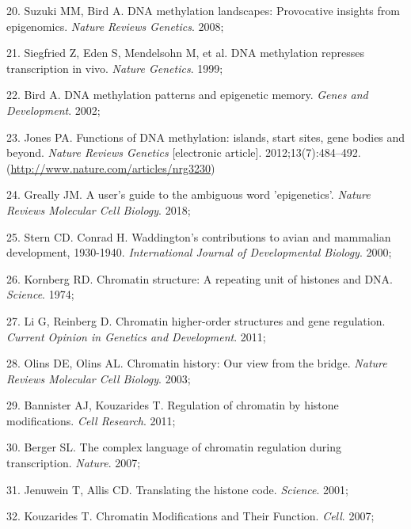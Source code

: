 \documentclass[11pt,oneside]{bristolthesis}
\newenvironment{cslreferences}%
  {}%
  {\par}
\begin{document}
\begin{cslreferences}
\leavevmode\hypertarget{ref-Suzuki2008}{}%
20. Suzuki MM, Bird A. DNA methylation landscapes: Provocative insights from epigenomics. \emph{Nature Reviews Genetics}. 2008;

\leavevmode\hypertarget{ref-Siegfried1999}{}%
21. Siegfried Z, Eden S, Mendelsohn M, et al. DNA methylation represses transcription in vivo. \emph{Nature Genetics}. 1999;

\leavevmode\hypertarget{ref-Bird2002}{}%
22. Bird A. DNA methylation patterns and epigenetic memory. \emph{Genes and Development}. 2002;

\leavevmode\hypertarget{ref-Jones2012}{}%
23. Jones PA. Functions of DNA methylation: islands, start sites, gene bodies and beyond. \emph{Nature Reviews Genetics} {[}electronic article{]}. 2012;13(7):484--492. (\url{http://www.nature.com/articles/nrg3230})

\leavevmode\hypertarget{ref-Greally2018}{}%
24. Greally JM. A user's guide to the ambiguous word 'epigenetics'. \emph{Nature Reviews Molecular Cell Biology}. 2018;

\leavevmode\hypertarget{ref-Stern2000}{}%
25. Stern CD. Conrad H. Waddington's contributions to avian and mammalian development, 1930-1940. \emph{International Journal of Developmental Biology}. 2000;

\leavevmode\hypertarget{ref-Kornberg1974}{}%
26. Kornberg RD. Chromatin structure: A repeating unit of histones and DNA. \emph{Science}. 1974;

\leavevmode\hypertarget{ref-Li2011}{}%
27. Li G, Reinberg D. Chromatin higher-order structures and gene regulation. \emph{Current Opinion in Genetics and Development}. 2011;

\leavevmode\hypertarget{ref-Olins2003}{}%
28. Olins DE, Olins AL. Chromatin history: Our view from the bridge. \emph{Nature Reviews Molecular Cell Biology}. 2003;

\leavevmode\hypertarget{ref-Bannister2011}{}%
29. Bannister AJ, Kouzarides T. Regulation of chromatin by histone modifications. \emph{Cell Research}. 2011;

\leavevmode\hypertarget{ref-Berger2007}{}%
30. Berger SL. The complex language of chromatin regulation during transcription. \emph{Nature}. 2007;

\leavevmode\hypertarget{ref-Jenuwein2001}{}%
31. Jenuwein T, Allis CD. Translating the histone code. \emph{Science}. 2001;

\leavevmode\hypertarget{ref-Kouzarides2007}{}%
32. Kouzarides T. Chromatin Modifications and Their Function. \emph{Cell}. 2007;


\end{cslreferences}
\end{document}
